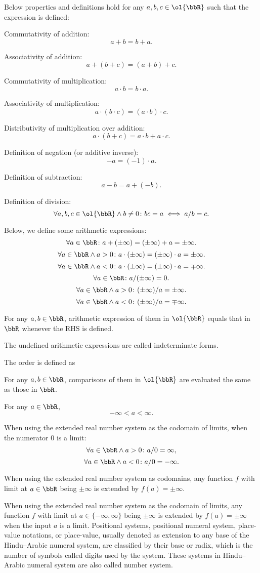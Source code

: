 \documentclass[a4paper,12pt]{report}
\begin{document}
\begin{itemizle}
\bit
\item Below properties and definitions hold for any $a,b,c\in\ol{\bbR}$ such that the expression is defined:
\bit
\item Commutativity of addition:
\[a+b=b+a.\]
\item Associativity of addition:
\[a+(b+c)=(a+b)+c.\]
\item Commutativity of multiplication:
\[a\cdot b=b\cdot a.\]
\item Associativity of multiplication:
\[a\cdot (b\cdot c)=(a\cdot b)\cdot c.\]
\item Distributivity of multiplication over addition:
\[a\cdot (b+c)=a\cdot b+a\cdot c.\]
\item Definition of negation (or additive inverse):
\[-a=(-1)\cdot a.\]
\item Definition of subtraction:
\[a-b=a+(-b).\]
\item Definition of division:
\[\forall a,b,c\in\ol{\bbR}\land b\neq 0\colon bc=a\iff a/b=c.\]
\eit
\item Below, we define some arithmetic expressions:
\[\forall a\in\bbR\colon a+(\pm\infty)=(\pm\infty)+a=\pm\infty.\]
\[\forall a\in\bbR\land a>0\colon a\cdot(\pm\infty)=(\pm\infty)\cdot a=\pm\infty.\]
\[\forall a\in\bbR\land a<0\colon a\cdot(\pm\infty)=(\pm\infty)\cdot a=\mp\infty.\]
\[\forall a\in\bbR\colon a/(\pm\infty)=0.\]
\[\forall a\in\bbR\land a>0\colon(\pm\infty)/a=\pm\infty.\]
\[\forall a\in\bbR\land a<0\colon(\pm\infty)/a=\mp\infty.\]
\item For any $a,b\in\bbR$, arithmetic expression of them in $\ol{\bbR}$ equals that in $\bbR$ whenever the RHS is defined.
\item The undefined arithmetic expressions are called indeterminate forms.
\item The order is defined as
\bit
\item For any $a,b\in\bbR$, comparisons of them in $\ol{\bbR}$ are evaluated the same as those in $\bbR$.
\item For any $a\in\bbR$,
\[-\infty<a<\infty.\]
\eit
\item When using the extended real number system as the codomain of limits, when the numerator $0$ is a limit:
\[\forall a\in\bbR\land a>0\colon a/0=\infty,\]
\[\forall a\in\bbR\land a<0\colon a/0=-\infty.\]
\item When using the extended real number system as codomains, any function $f$ with limit at $a\in\bbR$ being $\pm\infty$ is extended by $f(a)=\pm\infty$.
\item When using the extended real number system as the codomain of limits, any function $f$ with limit at $a\in\{-\infty,\infty\}$ being $\pm\infty$ is extended by $f(a)=\pm\infty$ when the input $a$ is a limit.
\eit
{}
Positional systems, positional numeral system, place-value notations, or place-value, usually denoted as extension to any base of the Hindu–Arabic numeral system, are classified by their base or radix, which is the number of symbols called digits used by the system. These systems in Hindu–Arabic numeral system are also called number system.


\end{itemizle}
\end{document}
